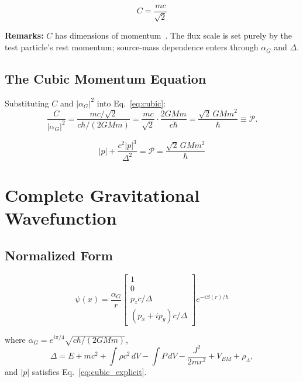 \documentclass[11pt,a4paper]{article}
\theoremstyle{definition}
\theoremstyle{remark}
\begin{document}
	\begin{equation}
		\boxed{C = \frac{mc}{\sqrt{2}}}
		\label{eq:C_final}
	\end{equation}
	
	\textbf{Remarks:}  $C$ has dimensions of momentum~\checkmark.  The flux scale is set purely by the test particle's rest momentum; source-mass dependence enters through $\alpha_G$ and $\Delta$.
	
	\subsection{The Cubic Momentum Equation}
	
	Substituting $C$ and $|\alpha_G|^2$ into Eq.~\eqref{eq:cubic}:
	\begin{equation}
		\frac{C}{|\alpha_G|^2} = \frac{mc/\sqrt{2}}{c\hbar/(2GMm)} = \frac{mc}{\sqrt{2}}\cdot\frac{2GMm}{c\hbar} = \frac{\sqrt{2}\,GMm^2}{\hbar} \equiv \mathcal{P}.
	\end{equation}
	
	\begin{equation}
		\boxed{|p| + \frac{c^2|p|^3}{\Delta^2} = \mathcal{P} = \frac{\sqrt{2}\,GMm^2}{\hbar}}
		\label{eq:cubic_explicit}
	\end{equation}
	
	\section{Complete Gravitational Wavefunction}
	
	\subsection{Normalized Form}
	
	\begin{equation}
		\boxed{\psi(x) = \frac{\alpha_G}{r}\begin{bmatrix}1\\0\\ p_zc/\Delta\\ (p_x+ip_y)c/\Delta\end{bmatrix}e^{-iS(r)/\hbar}}
		\label{eq:normalized_wavefunction}
	\end{equation}
	
	where $\alpha_G = e^{i\pi/4}\sqrt{c\hbar/(2GMm)}$,
	\begin{equation}
		\Delta = E + mc^2 + \int\rho c^2\,dV - \int P\,dV - \frac{J^2}{2mr^2} + V_{EM} + \rho_\Lambda,
	\end{equation}
	and $|p|$ satisfies Eq.~\eqref{eq:cubic_explicit}.
	
\end{document}
